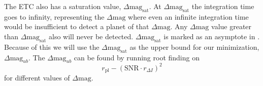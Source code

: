 The ETC also has a saturation value, $\Delta\textrm{mag}_\textrm{sat}$. At
$\Delta\textrm{mag}_\textrm{sat}$ the integration time goes to infinity,
representing the $\Delta\textrm{mag}$ where even an infinite integration time
would be insufficient to detect a planet of that $\Delta\textrm{mag}$. Any
$\Delta\textrm{mag}$ value greater than $\Delta\textrm{mag}_\textrm{sat}$ also
will never be detected. $\Delta\textrm{mag}_\textrm{sat}$ is marked as an
asymptote in . Because of this we will use the
$\Delta\textrm{mag}_\textrm{sat}$ as the upper bound for our minimization,
$\Delta\textrm{mag}_{ub}$. The $\Delta\textrm{mag}_{ub}$ can be found by
running root finding on 
\begin{equation}
  r_{\textrm{pl}} - \left(\textrm{SNR} \cdot r_{\Delta I}\right)^2
  \label{eq:sat_root}
\end{equation}
for different values of $\Delta\textrm{mag}$.

